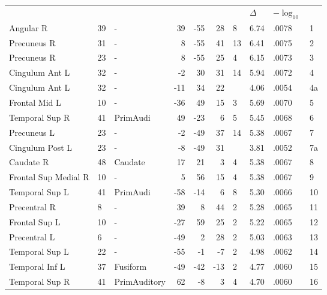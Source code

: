 \begin{table}
    \small
    \centering
    \begin{ThreePartTable}
        \begin{tabularx}{\textwidth}{l l p{1.6cm} *{3}{r} *{2}{P{.8cm}} P{1.3cm} P{.5cm}}


     \\
    \toprule
     &  &  &  &  &  &  & \(\Delta\)  & \(-\log_{10}\) &  \\
    \toprule

    Angular R & 39 & - & 39 & -55 & 28 & 8 &6.74&.0078& 1 \\
    Precuneus R & 31 & - & 8 & -55 & 41 & 13 &6.41&.0075& 2 \\
    Precuneus R & 23 & - & 8 & -55 & 25 & 4 &6.15&.0073& 3 \\
    Cingulum Ant L & 32 & - & -2 & 30 & 31 & 14 &5.94&.0072& 4 \\
    Cingulum Ant L & 32 & - & -11 & 34 & 22 &   &4.06&.0054& 4a \\
    Frontal Mid L & 10 & - & -36 & 49 & 15 & 3 &5.69&.0070& 5 \\
    Temporal Sup R & 41 & PrimAudi & 49 & -23 & 6 & 5 &5.45&.0068& 6 \\
    Precuneus L & 23 & - & -2 & -49 & 37 & 14 &5.38&.0067& 7 \\
    Cingulum Post L & 23 & - & -8 & -49 & 31 &   &3.81&.0052& 7a \\
    Caudate R & 48 & Caudate & 17 & 21 & 3 & 4 &5.38&.0067& 8 \\
    Frontal Sup Medial R & 10 & - & 5 & 56 & 15 & 4 &5.38&.0067& 9 \\
    Temporal Sup L & 41 & PrimAudi & -58 & -14 & 6 & 8 &5.30&.0066& 10 \\
    Precentral R & 8 & - & 39 & 8 & 44 & 2 &5.28&.0065& 11 \\
    Frontal Sup L & 10 & - & -27 & 59 & 25 & 2 &5.22&.0065& 12 \\
    Precentral L & 6 & - & -49 & 2 & 28 & 2 &5.03&.0063& 13 \\
    Temporal Sup L & 22 & - & -55 & -1 & -7 & 2 &4.98&.0062& 14 \\
    Temporal Inf L & 37 & Fusiform & -49 & -42 & -13 & 2 &4.77&.0060& 15 \\
    Temporal Sup R & 41 & PrimAuditory & 62 & -8 & 3 & 4 &4.70&.0060& 16 \\

\end{tabularx}
\end{ThreePartTable}
\end{table}
